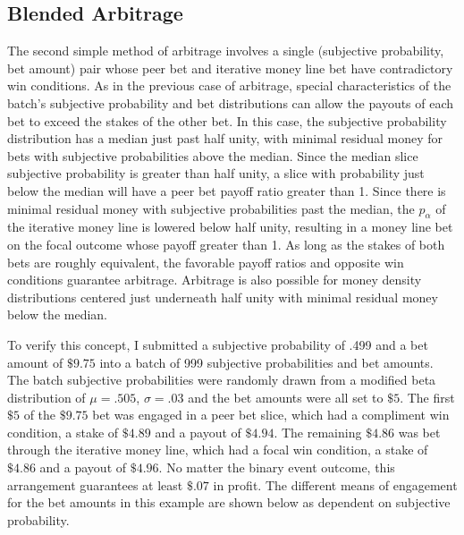 \documentclass[sn-mathphys-num]{sn-jnl}
\theoremstyle{thmstyleone}%
\theoremstyle{thmstyletwo}%
\theoremstyle{thmstylethree}%
\begin{document}
\subsection{Blended Arbitrage}

The second simple method of arbitrage involves a single (subjective probability, bet amount) pair whose peer bet and iterative money line bet have contradictory win conditions. As in the previous case of arbitrage, special characteristics of the batch's subjective probability and bet distributions can allow the payouts of each bet to exceed the stakes of the other bet. In this case, the subjective probability distribution has a median just past half unity, with minimal residual money for bets with subjective probabilities above the median. Since the median slice subjective probability is greater than half unity, a slice with probability just below the median will have a peer bet payoff ratio greater than 1. Since there is minimal residual money with subjective probabilities past the median, the $p_\alpha$ of the iterative money line is lowered below half unity, resulting in a money line bet on the focal outcome whose payoff greater than 1. As long as the stakes of both bets are roughly equivalent, the favorable payoff ratios and opposite win conditions guarantee arbitrage. Arbitrage is also possible for money density distributions centered just underneath half unity with minimal residual money below the median.

To verify this concept, I submitted a subjective probability of .499 and a bet amount of $\$9.75$ into a batch of 999 subjective probabilities and bet amounts. The 
batch subjective probabilities were randomly drawn from a modified beta distribution of $\mu = .505$, $\sigma = .03$ and the bet amounts were all set to $\$5$.
The first $\$5$ of the $\$9.75$ bet was engaged in a peer bet slice, which had a compliment win condition, a stake of $\$4.89$ and a payout of $\$4.94$. The remaining $\$4.86$ was bet through the iterative money line, which had a focal win condition, a stake of $\$4.86$ and a payout of $\$4.96$. No matter the binary event outcome, this arrangement guarantees at least $\$.07$ in profit. The different means of engagement for the bet amounts in this example are shown below as dependent on subjective probability. 
\end{document}
